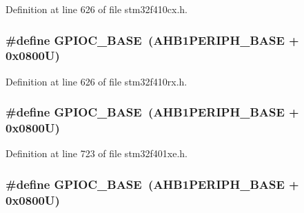 Definition at line 626 of file stm32f410cx.\+h.

\subsubsection[{\texorpdfstring{G\+P\+I\+O\+C\+\_\+\+B\+A\+SE}{GPIOC_BASE}}]{\setlength{\rightskip}{0pt plus 5cm}\#define G\+P\+I\+O\+C\+\_\+\+B\+A\+SE~({\bf A\+H\+B1\+P\+E\+R\+I\+P\+H\+\_\+\+B\+A\+SE} + 0x0800\+U)}\hypertarget{group___peripheral__registers__structures_ga26f267dc35338eef219544c51f1e6b3f}{}\label{group___peripheral__registers__structures_ga26f267dc35338eef219544c51f1e6b3f}


Definition at line 626 of file stm32f410rx.\+h.

\subsubsection[{\texorpdfstring{G\+P\+I\+O\+C\+\_\+\+B\+A\+SE}{GPIOC_BASE}}]{\setlength{\rightskip}{0pt plus 5cm}\#define G\+P\+I\+O\+C\+\_\+\+B\+A\+SE~({\bf A\+H\+B1\+P\+E\+R\+I\+P\+H\+\_\+\+B\+A\+SE} + 0x0800\+U)}\hypertarget{group___peripheral__registers__structures_ga26f267dc35338eef219544c51f1e6b3f}{}\label{group___peripheral__registers__structures_ga26f267dc35338eef219544c51f1e6b3f}


Definition at line 723 of file stm32f401xe.\+h.

\subsubsection[{\texorpdfstring{G\+P\+I\+O\+C\+\_\+\+B\+A\+SE}{GPIOC_BASE}}]{\setlength{\rightskip}{0pt plus 5cm}\#define G\+P\+I\+O\+C\+\_\+\+B\+A\+SE~({\bf A\+H\+B1\+P\+E\+R\+I\+P\+H\+\_\+\+B\+A\+SE} + 0x0800\+U)}\hypertarget{group___peripheral__registers__structures_ga26f267dc35338eef219544c51f1e6b3f}{}\label{group___peripheral__registers__structures_ga26f267dc35338eef219544c51f1e6b3f}


